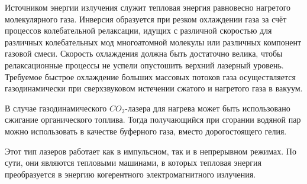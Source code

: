 Источником энергии излучения служит тепловая энергия равновесно нагретого 
молекулярного газа. Инверсия образуется при резком охлаждении газа за счёт 
процессов колебательной релаксации, идущих с различной скоростью для различных 
колебательных мод многоатомной молекулы или различных компонент газовой смеси. 
Скорость охлаждения должна быть достаточно велика, чтобы релаксационные 
процессы не успели опустошить верхний лазерный уровень. Требуемое быстрое 
охлаждение больших массовых потоков газа осуществляется газодинамически при 
сверхзвуковом истечении сжатого и нагретого газа в вакуум.

В случае газодинамического \( CO_2 \)-лазера для нагрева может быть 
использовано сжигание органического топлива. Тогда получающийся при сгорании 
водяной пар можно использовать в качестве буферного газа, вместо 
дорогостоящего гелия.

Этот тип лазеров работает как в импульсном, так и в непрерывном режимах. По 
сути, они являются тепловыми машинами, в которых тепловая энергия 
преобразуется в энергию когерентного электромагнитного излучения.
